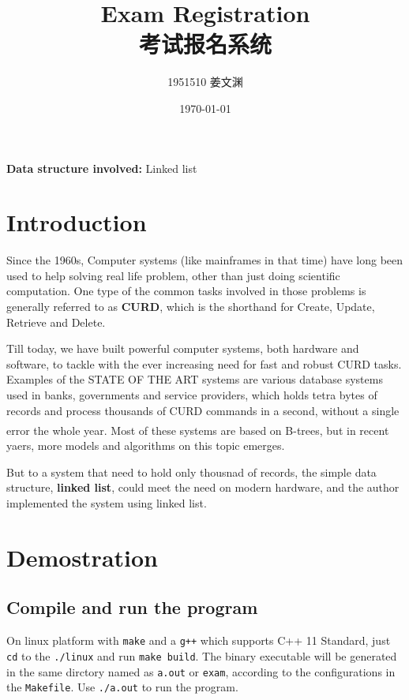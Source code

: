 \documentclass[cn,black,12pt,normal]{elegantnote}
\title{Exam Registration\\考试报名系统}
\author{1951510\; 姜文渊}
\institute{\small \url{https://github.com/jwyjohn/Jwy_DataStructureHomework}}
\date{\today}
\newcommand{\uct}[1]{\textsuperscript{\textsuperscript{\cite{#1}}}}
\begin{document}
\maketitle

\textbf{Data structure involved:} Linked list


\tableofcontents

\newpage


\section{Introduction}

Since the 1960s, Computer systems (like mainframes in that time) have long been used to help solving real life problem, other than just doing scientific computation. One type of the common tasks involved in those problems is generally referred to as \textbf{CURD}, which is the shorthand for Create, Update, Retrieve and Delete.

Till today, we have built powerful computer systems, both hardware and software, to tackle with the ever increasing need for fast and robust CURD tasks. Examples of the STATE OF THE ART systems are various database systems used in banks, governments and service providers, which holds tetra bytes of records and process thousands of CURD commands in a second, without a single error the whole year. Most of these systems are based on B-trees\uct{bayer1970textordfeminineorganization}, but in recent yaers, more models and algorithms on this topic emerges.

But to a system that need to hold only thousnad of records, the simple data structure, \textbf{linked list}, could meet the need on modern hardware, and the author implemented the system using linked list.

\section{Demostration}

\subsection{Compile and run the program}

On linux platform with \lstinline{make} and a \lstinline{g++} which supports C++ 11 Standard, just \lstinline{cd} to the \lstinline{./linux} and run \lstinline{make build}. The binary executable will be generated in the same dirctory named as \lstinline{a.out} or \lstinline{exam}, according to the configurations in the \lstinline{Makefile}. Use \lstinline{./a.out} to run the program.
\end{document}
